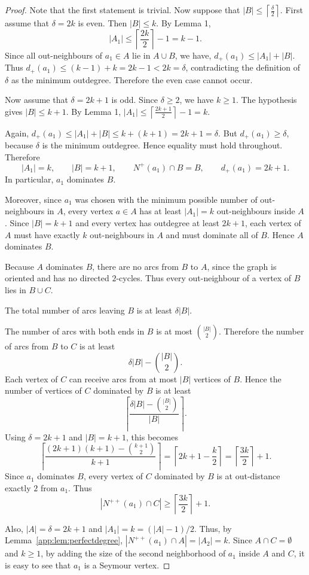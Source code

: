 \documentclass[a4paper,fleqn]{cas-sc}
\theoremstyle{definition}
\begin{document}
\begin{proof}
Note that the first statement is trivial. Now suppose that $|B|\leq \left\lceil \frac{\delta}{2}\right\rceil.$ First assume that \(\delta=2k\) is even. Then $|B|\leq k.$
By Lemma 1,
\[
|A_{1}|\leq \left\lceil \frac{2k}{2}\right\rceil-1=k-1.
\]
Since all out-neighbours of \(a_{1}\in A\) lie in \(A\cup B\), we have, $d_{+}(a_{1})\leq |A_{1}|+|B|.$
Thus $d_{+}(a_{1})\leq (k-1)+k=2k-1<2k=\delta$,
contradicting the definition of \(\delta\) as the minimum outdegree. Therefore the even case cannot occur.

Now assume that $\delta=2k+1$ is odd. Since \(\delta\geq 2\), we have \(k\geq 1\). The hypothesis gives $|B|\leq k+1.$
By Lemma 1, $|A_{1}|\leq \left\lceil \frac{2k+1}{2}\right\rceil-1=k.$

Again, $d_{+}(a_{1})\leq |A_{1}|+|B|\leq k+(k+1)=2k+1=\delta$.
But \(d_{+}(a_{1})\geq \delta\), because \(\delta\) is the minimum outdegree. Hence equality must hold throughout. Therefore
\[
|A_{1}|=k,
\qquad
|B|=k+1,
\qquad
N^{+}(a_{1})\cap B=B,
\qquad
d_{+}(a_{1})=2k+1.
\]
In particular, \(a_{1}\) dominates \(B\).

Moreover, since \(a_{1}\) was chosen with the minimum possible number of out-neighbours in \(A\), every vertex \(a\in A\) has at least \(|A_{1}|=k\) out-neighbours inside \(A\). Since \(|B|=k+1\) and every vertex has outdegree at least \(2k+1\), each vertex of \(A\) must have exactly \(k\) out-neighbours in \(A\) and must dominate all of \(B\). Hence \(A\) dominates \(B\).

Because \(A\) dominates \(B\), there are no arcs from \(B\) to \(A\), since the graph is oriented and has no directed \(2\)-cycles. Thus every out-neighbour of a vertex of \(B\) lies in \(B\cup C\).

The total number of arcs leaving \(B\) is at least $\delta |B|.$

The number of arcs with both ends in \(B\) is at most $\binom{|B|}{2}.$
Therefore the number of arcs from \(B\) to \(C\) is at least
\[
\delta |B|-\binom{|B|}{2}.
\]
Each vertex of \(C\) can receive arcs from at most \(|B|\) vertices of \(B\). Hence the number of vertices of \(C\) dominated by \(B\) is at least
\[
\left\lceil
\frac{\delta |B|-\binom{|B|}{2}}{|B|}
\right\rceil.
\]
Using \(\delta=2k+1\) and \(|B|=k+1\), this becomes
\[
\left\lceil
\frac{(2k+1)(k+1)-\binom{k+1}{2}}{k+1}
\right\rceil
=
\left\lceil
2k+1-\frac{k}{2}
\right\rceil
=
\left\lceil \frac{3k}{2}\right\rceil+1.
\]
Since \(a_{1}\) dominates \(B\), every vertex of \(C\) dominated by \(B\) is at out-distance exactly \(2\) from \(a_{1}\). Thus
\[
|N^{++}(a_{1}) \cap C|\geq \left\lceil \frac{3k}{2}\right\rceil+1.
\]

Also, \(|A|=\delta=2k+1\) and \(|A_{1}|=k=(|A|-1)/2\). Thus, by Lemma~\ref{app:lem:perfectdegree}, $|N^{++}(a_{1}) \cap A|=|A_{2}|=k$.
Since \(A\cap C=\emptyset\) and \(k\geq 1\), by adding the size of the second neighborhood of $a_1$ inside $A$ and $C$, it is easy to see that $a_1$ is a Seymour vertex.

\end{proof}
\end{document}
